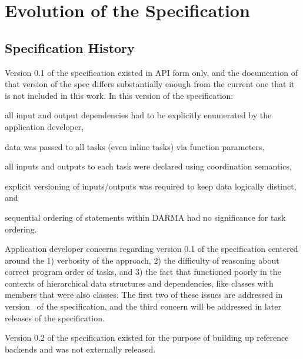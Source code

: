 
\chapter{Evolution of the Specification}
\label{chap:evolution}
\section{Specification History}
\label{sec:past}
Version 0.1 of the specification existed in \gls{API} form only, and
the documention of that version of the spec differs substantially
enough from the current one that it is not included in this work.
In this version of the specification:
\begin{compactenum}
\item all input and output dependencies had to be explicitly enumerated by the application
developer,
\item data was passed to all tasks (even inline tasks) via function parameters,
\item all inputs and outputs to each task were declared using \gls{coordination semantics},
\item explicit versioning of inputs/outputs was required to keep data
logically distinct, and
\item sequential ordering of statements within DARMA had no significance for task ordering.
\end{compactenum}

 Application developer concerns regarding version 0.1 of the specification
 centered around the 1) verbosity of the approach, 2) the difficulty of
 reasoning about correct program order of tasks, and 3) the fact that 
  functioned poorly in the contexts of hierarchical data
 structures and dependencies, like classes with members that were also
 classes.  The first two of these issues are addressed in version \specVersion\ of the
 specification, and the third concern will be addressed in later releases of the specification.

Version 0.2 of the specification existed for the purpose of building up reference backends
and was not externally released.


